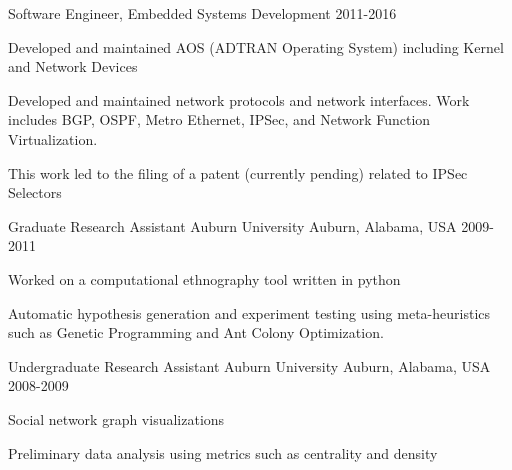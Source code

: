 \begin{cventries}
  \cventry
    {Software Engineer, Embedded Systems Development} %
    {} %
    {} %
    {2011-2016} %
    {
      \begin{cvitems} %
\item Developed and maintained AOS (ADTRAN Operating System) including Kernel and Network Devices
\item Developed and maintained network protocols and network interfaces. Work includes BGP, OSPF, Metro Ethernet, IPSec, and Network Function Virtualization.
\item This work led to the filing of a patent (currently pending) related to IPSec Selectors
      \end{cvitems}
    }

  \cventry
    {Graduate Research Assistant} %
    {Auburn University} %
    {Auburn, Alabama, USA} %
    {2009-2011} %
    {
      \begin{cvitems} %
\item Worked on a computational ethnography tool written in python
\item Automatic hypothesis generation and experiment testing using meta-heuristics such as Genetic Programming and Ant Colony Optimization.
      \end{cvitems}
    }

  \cventry
    {Undergraduate Research Assistant} %
    {Auburn University} %
    {Auburn, Alabama, USA} %
    {2008-2009} %
    {
      \begin{cvitems} %
\item Social network graph visualizations
\item Preliminary data analysis using metrics such as centrality and density
      \end{cvitems}
    }

\end{cventries}
